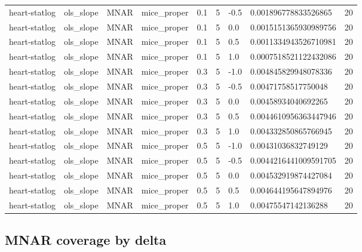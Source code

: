 \begin{tabular}{lllllllll}
heart-statlog & ols\_slope & MNAR & mice\_proper & 0.1 & 5 & -0.5 & 0.001896778833526865 & 20 \\
heart-statlog & ols\_slope & MNAR & mice\_proper & 0.1 & 5 & 0.0 & 0.0015151365930989756 & 20 \\
heart-statlog & ols\_slope & MNAR & mice\_proper & 0.1 & 5 & 0.5 & 0.0011334943526710981 & 20 \\
heart-statlog & ols\_slope & MNAR & mice\_proper & 0.1 & 5 & 1.0 & 0.0007518521122432086 & 20 \\
heart-statlog & ols\_slope & MNAR & mice\_proper & 0.3 & 5 & -1.0 & 0.004845829948078336 & 20 \\
heart-statlog & ols\_slope & MNAR & mice\_proper & 0.3 & 5 & -0.5 & 0.00471758517750048 & 20 \\
heart-statlog & ols\_slope & MNAR & mice\_proper & 0.3 & 5 & 0.0 & 0.00458934040692265 & 20 \\
heart-statlog & ols\_slope & MNAR & mice\_proper & 0.3 & 5 & 0.5 & 0.0044610956363447946 & 20 \\
heart-statlog & ols\_slope & MNAR & mice\_proper & 0.3 & 5 & 1.0 & 0.004332850865766945 & 20 \\
heart-statlog & ols\_slope & MNAR & mice\_proper & 0.5 & 5 & -1.0 & 0.00431036832749129 & 20 \\
heart-statlog & ols\_slope & MNAR & mice\_proper & 0.5 & 5 & -0.5 & 0.0044216441009591705 & 20 \\
heart-statlog & ols\_slope & MNAR & mice\_proper & 0.5 & 5 & 0.0 & 0.004532919874427084 & 20 \\
heart-statlog & ols\_slope & MNAR & mice\_proper & 0.5 & 5 & 0.5 & 0.004644195647894976 & 20 \\
heart-statlog & ols\_slope & MNAR & mice\_proper & 0.5 & 5 & 1.0 & 0.00475547142136288 & 20 \\
\hline
\end{tabular}

\subsection*{MNAR coverage by delta}

